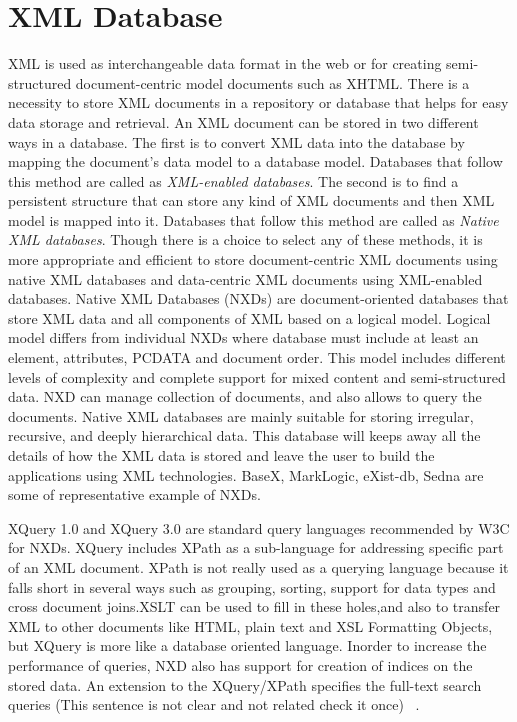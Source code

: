 \section{XML Database}

  XML is used as interchangeable data format in the web or for creating semi-structured document-centric model documents such as XHTML. There is a necessity to store XML documents in a repository or database that helps for easy data storage and retrieval. An XML document can be stored in two different ways in a database. The first is to convert XML data into the database by mapping the document's data model to a database model. Databases that follow this method are called as \textit{XML-enabled databases}. The second is to find a persistent structure that can store any kind of XML documents and then XML model is mapped into it. Databases that follow this method are called as \textit{Native XML databases}\cite{pavlovic2007native}. Though there is a choice to select any of these methods, it is more appropriate and efficient to store document-centric XML documents using native XML databases and data-centric XML documents using XML-enabled databases.	Native XML Databases (NXDs) are document-oriented databases that store XML data and all components of XML based on a logical model. Logical model differs from individual NXDs where database must include at least an element, attributes, PCDATA and document order. This model includes different levels of complexity and complete support for mixed content and semi-structured data. NXD can manage collection of documents, and also allows to query the documents. Native XML databases are mainly suitable for storing irregular, recursive, and deeply hierarchical data. This database will keeps away all the details of how the XML data is stored and leave the user to build the applications using XML technologies.  BaseX, MarkLogic, eXist-db, Sedna are some of representative example of  NXDs. 
  \par XQuery 1.0 and XQuery 3.0 are standard query languages recommended by W3C for NXDs. XQuery includes XPath as a sub-language for addressing specific part of an XML document. XPath is not really used as a querying language because it falls short in several ways such as grouping, sorting, support for data types and cross document joins.XSLT can be used to fill in these holes,and also to transfer XML to other documents like HTML, plain text and XSL Formatting Objects, but XQuery is more like a database oriented language.  Inorder to increase the performance of queries, NXD also has support for creation of indices on the stored data.\cite{pavlovic2007native} An extension to the XQuery/XPath specifies the full-text search queries (This sentence is not clear and not related check it once) ~\cite{simanjuntak2015query}.
